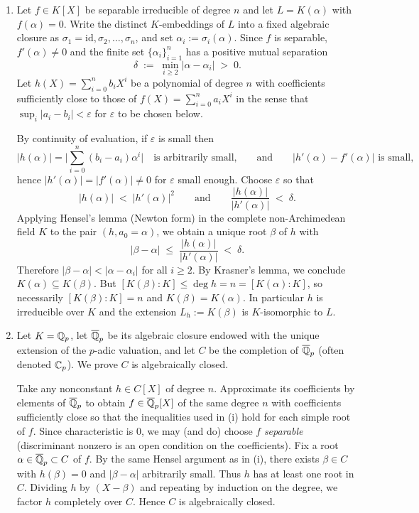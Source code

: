\documentclass[12pt]{article}  %
\begin{document}
\begin{solution}
    \begin{enumerate}
        \item Let $f\in K[X]$ be separable irreducible of degree $n$ and let $L=K(\alpha)$ with $f(\alpha)=0$. Write the distinct $K$-embeddings of $L$ into a fixed algebraic closure as $\sigma_1=\mathrm{id},\sigma_2,\dots,\sigma_n$, and set $\alpha_i:=\sigma_i(\alpha)$. Since $f$ is separable, $f'(\alpha)\neq 0$ and the finite set $\{\alpha_i\}_{i=1}^n$ has a positive mutual separation
\[
\delta \;:=\; \min_{i\ge 2}|\alpha-\alpha_i| \;>\;0.
\]
Let $h(X)=\sum_{i=0}^n b_iX^i$ be a polynomial of degree $n$ with coefficients sufficiently close to those of $f(X)=\sum_{i=0}^n a_iX^i$ in the sense that $\sup_i|a_i-b_i|<\varepsilon$ for $\varepsilon$ to be chosen below.

By continuity of evaluation, if $\varepsilon$ is small then
\[
|h(\alpha)|=\Big|\sum_{i=0}^n (b_i-a_i)\alpha^i\Big| \quad\text{is arbitrarily small,}
\qquad\text{and}\qquad
|h'(\alpha)-f'(\alpha)| \text{ is small,}
\]
hence $|h'(\alpha)|=|f'(\alpha)|\neq 0$ for $\varepsilon$ small enough. Choose $\varepsilon$ so that
\[
|h(\alpha)| \;<\; |h'(\alpha)|^2
\qquad\text{and}\qquad
\frac{|h(\alpha)|}{|h'(\alpha)|} \;<\; \delta .
\]
Applying Hensel's lemma (Newton form) in the complete non-Archimedean field $K$ to the pair $(h,a_0=\alpha)$, we obtain a unique root $\beta$ of $h$ with
\[
|\beta-\alpha| \;\le\; \frac{|h(\alpha)|}{|h'(\alpha)|} \;<\; \delta.
\]
Therefore $|\beta-\alpha|<|\alpha-\alpha_i|$ for all $i\ge 2$. By Krasner's lemma, we conclude $K(\alpha)\subseteq K(\beta)$.
But $[K(\beta):K]\le \deg h=n=[K(\alpha):K]$, so necessarily $[K(\beta):K]=n$ and $K(\beta)=K(\alpha)$. In particular $h$ is irreducible over $K$ and the extension $L_h:=K(\beta)$ is $K$-isomorphic to $L$.

\item Let $K=\mathbb{Q}_p$, let $\overline{\mathbb{Q}}_p$ be its algebraic closure endowed with the unique extension of the $p$-adic valuation, and let $C$ be the completion of $\overline{\mathbb{Q}}_p$ (often denoted $\mathbb{C}_p$). We prove $C$ is algebraically closed.

Take any nonconstant $h\in C[X]$ of degree $n$. Approximate its coefficients by elements of $\overline{\mathbb{Q}}_p$ to obtain $f\in \overline{\mathbb{Q}}_p[X]$ of the same degree $n$ with coefficients sufficiently close so that the inequalities used in (i) hold for each simple root of $f$. Since characteristic is $0$, we may (and do) choose $f$ \emph{separable} (discriminant nonzero is an open condition on the coefficients). Fix a root $\alpha\in \overline{\mathbb{Q}}_p\subset C$ of $f$. By the same Hensel argument as in (i), there exists $\beta\in C$ with $h(\beta)=0$ and $|\beta-\alpha|$ arbitrarily small. Thus $h$ has at least one root in $C$. Dividing $h$ by $(X-\beta)$ and repeating by induction on the degree, we factor $h$ completely over $C$. Hence $C$ is algebraically closed.
\end{enumerate}
\end{solution}
\end{document}
